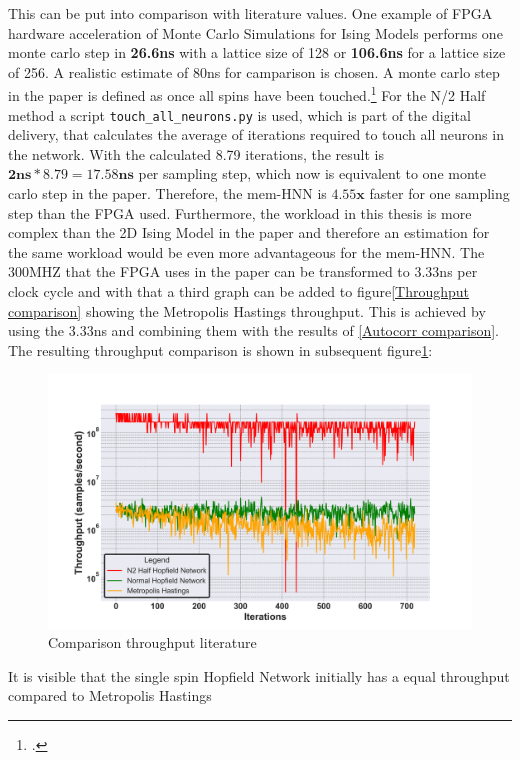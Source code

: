 This can be put into comparison with literature values. One example of \ac{FPGA} hardware acceleration of Monte Carlo Simulations for Ising Models
performs one monte carlo step in \textbf{26.6ns} with a lattice size of 128 or \textbf{106.6ns} for a lattice size of 256.
A realistic estimate of 80ns for camparison is chosen. 
A monte carlo step in the paper is defined as once all spins have been touched.\footcite[cf.][4]{ortega-zamoranoFPGAHardwareAcceleration2016}
For the N/2 Half method a script \texttt{touch\_all\_neurons.py} is used, which is part of the digital delivery, that calculates  
the average of iterations required to touch all neurons in the network.
With the calculated 8.79 iterations, the result is \(\mathbf{2ns * 8.79 = 17.58ns}\) per sampling step, which now is equivalent to one monte carlo step in the paper.
Therefore, the \ac{mem-HNN} is \(\mathbf{4.55x}\) faster for one sampling step than the \ac{FPGA} used.
Furthermore, the workload in this thesis is more complex than the 2D Ising Model in the paper and therefore an estimation for the same 
workload would be even more advantageous for the \ac{mem-HNN}. 
The 300MHZ that the \ac{FPGA} uses in the paper can be transformed to 3.33ns per clock cycle and with that a third graph can be added to figure\ref{Throughput comparison} showing the Metropolis Hastings throughput.
This is achieved by using the 3.33ns and combining them with the results of \ref{Autocorr comparison}.
The resulting throughput comparison is shown in subsequent figure\ref{Comparison_throughput_literature_3}:
\begin{figure}[H]
    \centering
    \includegraphics[width=0.8\linewidth]{graphics/Visualisierungen_throughput_MODIFIED.png}
    \caption{Comparison throughput literature}
    \label{Comparison_throughput_literature_3}
\end{figure}
It is visible that the single spin Hopfield Network initially has a equal throughput compared to Metropolis Hastings 
